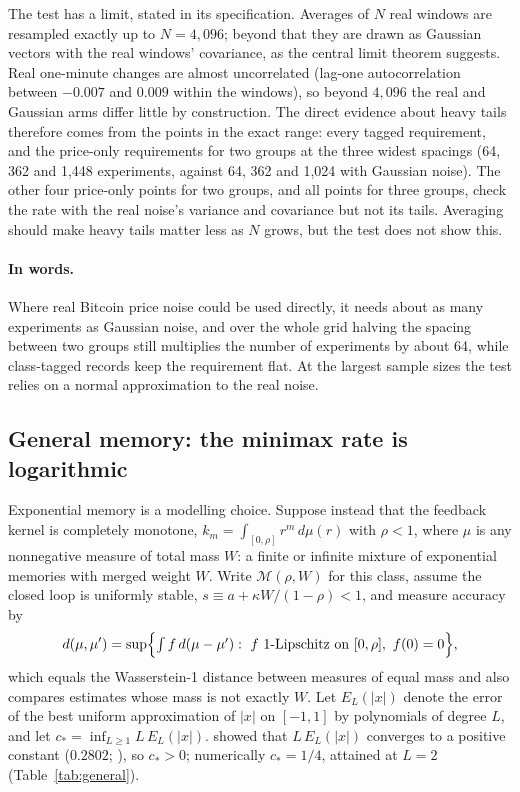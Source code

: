 \documentclass[12pt]{article}
\theoremstyle{definition}
\theoremstyle{remark}
\begin{document}
The test has a limit, stated in its specification. Averages of $N$ real windows are resampled exactly up to $N=4{,}096$; beyond that they are drawn as Gaussian vectors with the real windows' covariance, as the central limit theorem suggests. Real one-minute changes are almost uncorrelated (lag-one autocorrelation between $-0.007$ and $0.009$ within the windows), so beyond $4{,}096$ the real and Gaussian arms differ little by construction. The direct evidence about heavy tails therefore comes from the points in the exact range: every tagged requirement, and the price-only requirements for two groups at the three widest spacings (64, 362 and 1{,}448 experiments, against 64, 362 and 1{,}024 with Gaussian noise). The other four price-only points for two groups, and all points for three groups, check the rate with the real noise's variance and covariance but not its tails. Averaging should make heavy tails matter less as $N$ grows, but the test does not show this.

\paragraph{In words.} Where real Bitcoin price noise could be used directly, it needs about as many experiments as Gaussian noise, and over the whole grid halving the spacing between two groups still multiplies the number of experiments by about 64, while class-tagged records keep the requirement flat. At the largest sample sizes the test relies on a normal approximation to the real noise.

\subsection{General memory: the minimax rate is logarithmic}\label{sec:general}

Exponential memory is a modelling choice. Suppose instead that the feedback kernel is completely monotone, $k_m=\int_{[0,\rho]}r^m\,d\mu(r)$ with $\rho<1$, where $\mu$ is any nonnegative measure of total mass $W$: a finite or infinite mixture of exponential memories with merged weight $W$. Write $\mathcal M(\rho,W)$ for this class, assume the closed loop is uniformly stable, $s\equiv a+\kappa W/(1-\rho)<1$, and measure accuracy by
\[
d(\mu,\mu')=\sup\Bigl\{\textstyle\int f\,d(\mu-\mu'):\ f\ \text{1-Lipschitz on }[0,\rho],\ f(0)=0\Bigr\},
\]
which equals the Wasserstein-1 distance between measures of equal mass and also compares estimates whose mass is not exactly $W$. Let $E_L(|x|)$ denote the error of the best uniform approximation of $|x|$ on $[-1,1]$ by polynomials of degree $L$, and let $c_*=\inf_{L\ge1}L\,E_L(|x|)$. \citet{bernstein1914} showed that $L\,E_L(|x|)$ converges to a positive constant ($0.2802$; \citealp{varga1985}), so $c_*>0$; numerically $c_*=1/4$, attained at $L=2$ (Table~\ref{tab:general}).
\end{document}

